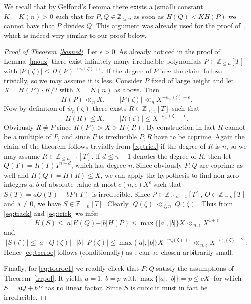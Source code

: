\documentclass[12pt]{amsart}
\theoremstyle{definition}
\begin{document}
We recall that by Gelfond's Lemma there exists 
a (small) constant $K=K(n)>0$
such that for $P,Q\in\mathbb{Z}_{\leq n}$ as soon as $H(Q)<KH(P)$
we cannot have that $P$ divides $Q$. This argument was already used
for the proof of~\cite[Theorem~2.3]{bschlei}, which is indeed
very similar to our proof below.

\begin{proof}[Proof of Theorem~\ref{basned}]
Let $\epsilon>0$. As already noticed in the proof 
of Lemma~\ref{mouz} there exist
infinitely many irreducible polynomials 
$P\in \mathbb{Z}_{\leq n}[T]$ with 
$\vert P(\zeta)\vert\leq H(P)^{-w_{n}(\zeta)+\epsilon}$. 
If the degree of $P$ is $n$ the claim follows trivially,
so we may assume it is less. Consider $P$ fixed of large height
and let $X=H(P)\cdot K/2$ with $K=K(n)$ as above. Then 
%
\begin{equation} \label{eq:track}
H(P)\ll_{n} X, \qquad
\vert P(\zeta)\vert\ll_{n} X^{-w_{n}(\zeta)+\epsilon}.
\end{equation}
%
Now by definition of $\widehat{w}_{n}(\zeta)$ there exists 
$R\in \mathbb{Z}_{\leq n}[T]$ such that
%
\begin{equation} \label{eq:trick}
H(R)\leq X, \qquad
\vert R(\zeta)\vert\leq X^{-\widehat{w}_{n}(\zeta)+\epsilon}.
\end{equation}
%
Obviously $R\neq P$ since $H(P)>X>H(R)$.
By construction in fact
$R$ cannot be a multiple of $P$, and
since $P$ is irreducible $P,R$ have to be coprime.
Again the claim of the theorem follows trivially from \eqref{eq:trick}
if the degree of $R$ is $n$, 
so we may assume $R\in\mathbb{Z}_{\leq n-1}[T]$. 
If $d\leq n-1$ denotes the degree of $R$, then 
let $Q(T)=R(T)T^{n-d}$, which has degree $n$.
Since obviously $P,Q$ are coprime as well and $H(Q)=H(R)\leq X$, 
we can apply the hypothesis to find non-zero
integers $a,b$ of absolute value at most $c(n,\epsilon)X^{\epsilon}$ 
such that $S(T)=aQ(T)+bP(T)$ is irreducible. 
Since $P\in\mathbb{Z}_{\leq n-1}[T]$,
$Q\in\mathbb{Z}_{=n}[T]$ and $a\neq 0$,
we have $S\in\mathbb{Z}_{=n}[T]$.
Clearly $\vert Q(\zeta)\vert\ll_{\zeta,n} \vert Q(\zeta)\vert$.
Thus from \eqref{eq:track} and \eqref{eq:trick} we infer
%
\[
H(S)\leq \vert a\vert H(Q)+\vert b\vert H(P)\leq \max\{\vert a\vert,
\vert b\vert\} X
\ll_{n,\epsilon} X^{1+\epsilon}
\]
and
%
\[
\vert S(\zeta)\vert\leq \vert a\vert \cdot\vert Q(\zeta)\vert+
\vert b\vert \cdot\vert P(\zeta)\vert
\leq \max\{\vert a\vert,
\vert b\vert\} X^{-\widehat{w}_{n}(\zeta)+\epsilon}
\ll_{n,\zeta} 
X^{-\widehat{w}_{n}(\zeta)+2\epsilon}.
\]
%
Hence \eqref{eq:toeroe} follows (conditionally) 
as $\epsilon$ can be chosen arbitrarily small. 

Finally, for \eqref{eq:toeroe1} we readily check that $P,Q$
satisfy the assumptions of Theorem~\ref{irrpol}. 
It yields $a=1$, $b=p$ with 
$\max\{\vert a\vert, \vert b\vert\}=p\leq cX^{\epsilon}$
for which $S=aQ+bP$ has no linear factor. Since $S$ is cubic 
it must in fact be irreducible.
\end{proof}
\end{document}
